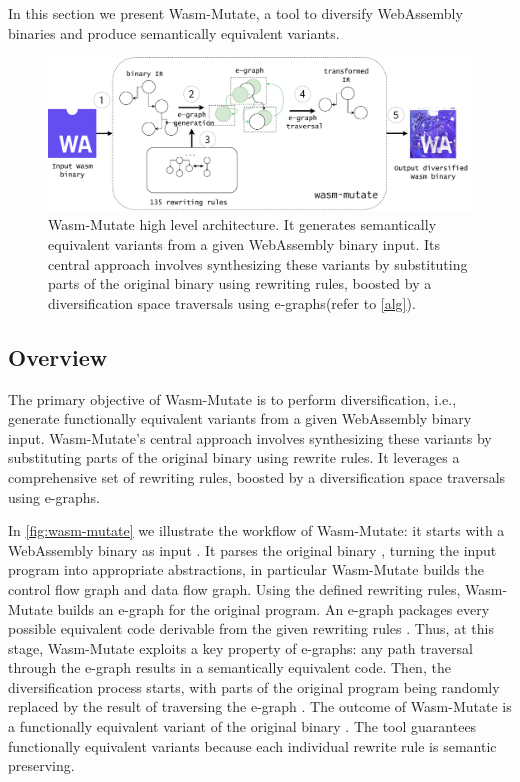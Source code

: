 \documentclass[a4paper,fleqn]{cas-dc}
\newcommand{\tool}{{\sc Wasm-Mutate}\xspace}
\newcommand*\step[1]{
\noindent\tikz[baseline=(char.base)]{
        \node[shape=circle,text=black,draw=black, fill=white,inner sep=1.2pt] (char) {#1};}}
\begin{document}
In this section we present \tool, a tool to diversify
WebAssembly binaries and produce semantically equivalent variants.
\begin{figure}[h!]
    \centering
    \includegraphics[width=0.9\linewidth]{figures/workflow.v2.pdf}
    \caption{ \tool high level architecture.  It generates semantically equivalent variants from a given WebAssembly binary input. 
    Its central approach involves synthesizing these variants by substituting parts of the original binary using rewriting rules, boosted by a diversification space traversals using e-graphs(refer to \autoref{alg}).}
  \label{fig:wasm-mutate}
\end{figure}


\subsection{Overview}
The primary objective of \tool is to perform diversification, i.e., generate functionally equivalent variants from a given WebAssembly binary input. 
\tool's central approach involves synthesizing these variants by substituting parts of the original binary using rewrite rules. 
It leverages a comprehensive set of rewriting rules, boosted by a diversification space traversals using e-graphs.


In \autoref{fig:wasm-mutate} we illustrate the workflow of \tool: it starts with a WebAssembly binary as input \step{1}.
It parses the original binary \step{2}, turning the input program into appropriate abstractions, in particular \tool builds the control flow graph and data flow graph. 
Using the defined rewriting rules, \tool builds an e-graph \step{3} for the original program.
An e-graph packages every possible equivalent code derivable from the given rewriting rules  \cite{10.1145/3434304, 10.1145/3385412.3386001}.
Thus, at this stage, \tool exploits a key property of e-graphs:
any path traversal through the e-graph results in a semantically equivalent code.
Then, the diversification process starts, with parts of the original program being randomly replaced by the result of traversing the e-graph \step{4}.
The outcome of \tool is a functionally equivalent variant of the original binary \step{5}.
The tool guarantees functionally equivalent variants because each individual rewrite rule is semantic preserving.
\end{document}
